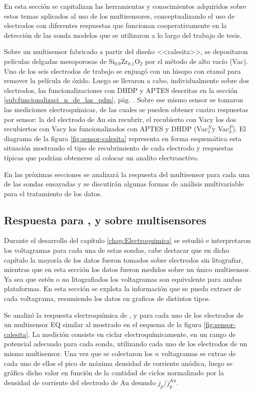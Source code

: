    		En esta sección se capitalizan las herramientas y conocimientos adquiridos sobre estos temas aplicados al uso de los multisensores, conceptualizando el uso de electrodos con diferentes respuestas que funcionan cooperativamente en la detección de las sonda modelos que se utilizaron a lo largo del trabajo de tesis. 

			Sobre un multisensor fabricado a partir del diseño <<calesita>>, se depositaron películas delgadas mesoporosas de Si$_{0.9}$Zr$_{0.1}$O$_2$ por el método de alto vacío (Vac\pdmZ). Uno de los seis electrodos de trabajo se enjuagó con un hisopo con etanol para remover la película de óxido. Luego se llevaron a cabo, individualmente sobre dos electrodos, las funcionalizaciones con DHDP y APTES descritas en la sección \ref{sub:funcionalizaci_n_de_las_pdm}, pág. \pageref{sub:funcionalizaci_n_de_las_pdm}. Sobre ese mismo sensor se tomaron las mediciones electroquímicas, de las cuales se pueden obtener cuatro respuestas por sensor: la del electrodo de Au sin recubrir, el recubierto con Vac\pdmZ\space y los dos recubiertos con Vac\pdmZ\space y los funcionalizados con APTES y DHDP (Vac\pdmZ$^N_1$\space y  Vac\pdmZ$^P_3$). El diagrama de la figura \ref{fig:sensor-calesita} representa en forma esquemática esta situación mostrando el tipo de recubrimiento de cada electrodo y respuestas típicas que podrían obtenerse al colocar un analito electroactivo. 

			En las próximas secciones se analizará la respuesta del multisensor para cada una de las sondas ensayadas y se discutirán algunas formas de análisis multivariable para el tratamiento de los datos. 

	\subsection{Respuesta para \ru, \fe\space y \fc\space sobre multisensores}	

		Durante el desarrollo del capítulo \ref{chap:Electroquimica} se estudió e interpretaron los voltagramas para cada una de estas sondas, cabe destacar que en dicho capítulo la mayoría de los datos fueron tomados sobre electrodos sin litografiar, mientras que en esta sección los datos fueron medidos sobre un único multisensor. Ya sea que estén o no litografiados los voltagramas son equivalente para ambas plataformas. En esta sección se explota la información que se pueda extraer de cada voltagrama, resumiendo los datos en graficos de distintos tipos.

		Se analizó la respuesta electroquímica de \aminorutenio, \ferroferri\space y \ferroceno\space para cada uno de los electrodos de un multisensor EQ similar al mostrado en el esquema de la figura \ref{fig:sensor-calesita}. La medición consiste en ciclar electroquímicamente, en un rango de potencial adecuado para cada sonda, utilizando cada uno de los electrodos de un mismo multisensor. Una vez que se colectaron los $n$ voltagramas se extrae de cada uno de ellos el pico de máxima densidad de corriente anódica, luego se gráfica dicho valor en función de la cantidad de ciclos normalizado por la densidad de corriente del electrodo de Au desnudo $j_p/j_p^\text{Au}$.

